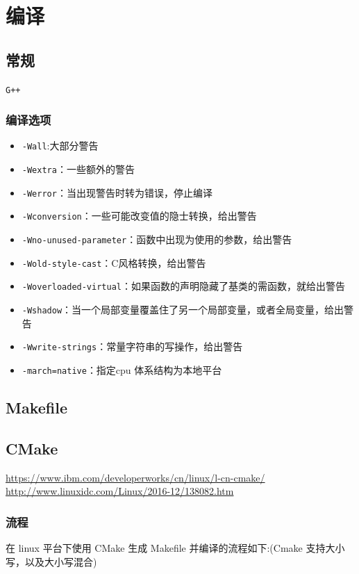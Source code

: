 \documentclass[UTF8,a4paper,8pt]{ctexbook}
\begin{document}
		
\chapter{编译}
	\section{常规}
		\verb|G++|
		
		\subsection{编译选项}
			\begin{itemize}
				\item \verb|-Wall|:大部分警告
				\item \verb|-Wextra|：一些额外的警告
				\item \verb|-Werror|：当出现警告时转为错误，停止编译
				\item \verb|-Wconversion|：一些可能改变值的隐士转换，给出警告
				\item \verb|-Wno-unused-parameter|：函数中出现为使用的参数，给出警告
				\item \verb|-Wold-style-cast|：C风格转换，给出警告
				\item \verb|-Woverloaded-virtual|：如果函数的声明隐藏了基类的需函数，就给出警告
				\item \verb|-Wshadow|：当一个局部变量覆盖住了另一个局部变量，或者全局变量，给出警告
				\item \verb|-Wwrite-strings|：常量字符串的写操作，给出警告
				\item \verb|-march=native|：指定cpu 体系结构为本地平台
			\end{itemize}
	\section{Makefile}
	
	
	\section{CMake}	
		\url{https://www.ibm.com/developerworks/cn/linux/l-cn-cmake/}
		\url{http://www.linuxidc.com/Linux/2016-12/138082.htm}
		
		\subsection{流程}
			在 linux 平台下使用 CMake 生成 Makefile 并编译的流程如下:(Cmake 支持大小写，以及大小写混合)
			
\end{document}
